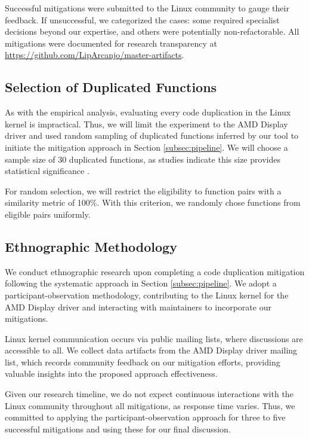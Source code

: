 Successful mitigations were submitted to the Linux community to gauge their feedback. If unsuccessful, we categorized the cases: some required specialist decisions beyond our expertise, and others were potentially non-refactorable. All mitigations were documented for research transparency at \url{https://github.com/LipArcanjo/master-artifacts}.

\subsection{Selection of Duplicated Functions}

As with the empirical analysis, evaluating every code duplication in the Linux kernel is impractical. 
Thus, we will limit the experiment to the AMD Display driver and used random sampling of duplicated functions
inferred by our tool to initiate the mitigation approach in Section \ref{subsec:pipeline}. 
We will choose a sample size of 30 duplicated functions, as studies indicate this size provides 
statistical significance \citep{sample1, sample2}.

For random selection, we will restrict the eligibility to function pairs with a similarity metric of 100\%. 
With this criterion, we randomly chose functions from eligible pairs uniformly.

\subsection{Ethnographic Methodology}

We conduct ethnographic research upon completing a code duplication mitigation following the systematic approach in Section \ref{subsec:pipeline}. We adopt a participant-observation methodology, contributing to the Linux kernel for the AMD Display driver and interacting with maintainers to incorporate our mitigations.

Linux kernel communication occurs via public mailing lists, where discussions are accessible to all. We collect data artifacts from the AMD Display driver mailing list, which records community feedback on our mitigation efforts, providing valuable insights into the proposed approach effectiveness.

Given our research timeline, we do not expect continuous interactions with the Linux community throughout all mitigations, as response time varies. Thus, we committed to applying the participant-observation approach for three to five successful mitigations and using these for our final discussion.
